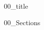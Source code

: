 \documentclass{article}
\begin{document}
{00_title}

\frontmatter

\tableofcontents

\listoffigures
\listoftables

\mainmatter


{00_Sections}


\newpage
\printbibliography[heading = bibintoc]    %

\end{document}
